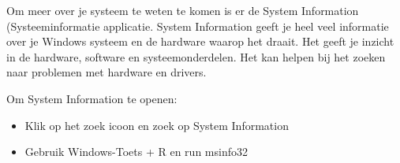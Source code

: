 Om meer over je systeem te weten te komen is er de System Information (Systeeminformatie applicatie. System Information geeft je heel veel informatie over je Windows systeem en de hardware waarop het draait. Het geeft je inzicht in de hardware, software en systeemonderdelen. Het kan helpen bij het zoeken naar problemen met hardware en drivers.

Om System Information te openen:
\begin{itemize}
\item Klik op het zoek icoon en zoek op System Information
\item Gebruik Windows-Toets + R en run msinfo32
\end{itemize}

\begin{minipage}[t]{\linewidth}
\raggedright
{}
\end{minipage}

